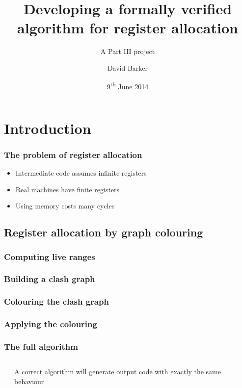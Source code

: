\documentclass{beamer}
\title[Verified register allocation]{Developing a formally verified algorithm for register allocation}
\subtitle{A Part III project}
\author{David Barker}
\date{9\textsuperscript{th} June 2014}
\begin{document}
\frame{\titlepage}

\section{Introduction}

\begin{frame}
\frametitle{The problem of register allocation}

\begin{itemize}
	\item Intermediate code assumes infinite registers
	\item Real machines have finite registers
	\item Using memory costs many cycles
\end{itemize}
\end{frame}

\subsection{Register allocation by graph colouring}
\begin{frame}
\frametitle{Computing live ranges}
\end{frame}

\begin{frame}
\frametitle{Building a clash graph}
\end{frame}

\begin{frame}
\frametitle{Colouring the clash graph}
\end{frame}

\begin{frame}
\frametitle{Applying the colouring}
\end{frame}

\begin{frame}
\frametitle{The full algorithm}

\begin{columns}[c]
 \begin{center}
\end{center}
 A correct algorithm will generate output code with exactly the same behaviour
\end{columns}
\end{frame}
\end{document}
